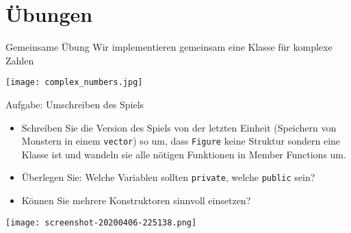 \documentclass[presentation]{beamer}
\begin{document}
\section{Übungen}
\label{sec:org058c881}
\begin{frame}[label={sec:org74ef8db}]{Gemeinsame Übung}
Wir implementieren gemeinsam eine \alert{Klasse für komplexe Zahlen}
\begin{center}
\texttt{[image: complex\_numbers.jpg]}
\end{center}
\end{frame}
\begin{frame}[label={sec:orgd73b4f6},fragile]{Aufgabe: Umschreiben des Spiels}
 \begin{itemize}
\item Schreiben Sie die Version des Spiels von der letzten Einheit
(Speichern von Monstern in einem {\color{solarizedYellow}\verb!vector!}) so um, dass {\color{solarizedYellow}\verb!Figure!}
keine Struktur sondern eine Klasse ist und wandeln sie alle nötigen
Funktionen in Member Functions um.
\item Überlegen Sie: Welche Variablen sollten {\color{solarizedYellow}\verb!private!}, welche {\color{solarizedYellow}\verb!public!}
sein?
\item Können Sie mehrere Konstruktoren sinnvoll einsetzen?
\end{itemize}
\begin{center}
\texttt{[image: screenshot-20200406-225138.png]}
\end{center}
\end{frame}
\end{document}
